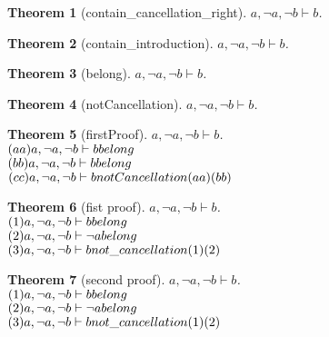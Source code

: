 \documentclass[11pt]{article}
\newtheorem{theorem}{Theorem}
\def\turn{\vdash}
\begin{document}
\begin{theorem}[contain_cancellation_right] $ a, \neg a, \neg b \turn b $.\\
\end{theorem}
\begin{theorem}[contain_introduction] $ a, \neg a, \neg b \turn b $.\\
\end{theorem}
\begin{theorem}[belong] $ a, \neg a, \neg b \turn b $.\\
\end{theorem}
\begin{theorem}[notCancellation] $ a, \neg a, \neg b \turn b $.\\
\end{theorem}
\begin{theorem}[firstProof] $ a, \neg a, \neg b \turn b $.\\
$(aa)a, \neg a, \neg b \turn b \hfill belong  $\\
$(bb)a, \neg a, \neg b \turn b \hfill belong  $\\
$(cc)a, \neg a, \neg b \turn b \hfill notCancellation (aa)(bb) $\\
\end{theorem}
\begin{theorem}[fist proof] $ a, \neg a, \neg b \turn b $.\\
$(1)a, \neg a, \neg b \turn b \hfill belong $\\
$(2)a, \neg a, \neg b \turn \neg a \hfill belong $\\
$(3)a, \neg a, \neg b \turn b \hfill not \_ cancellation (1)(2) $\\
\end{theorem}
\begin{theorem}[second proof] $ a, \neg a, \neg b \turn b $.\\
$(1)a, \neg a, \neg b \turn b \hfill belong $\\
$(2)a, \neg a, \neg b \turn \neg a \hfill belong $\\
$(3)a, \neg a, \neg b \turn b \hfill not \_ cancellation (1)(2) $\\
\end{theorem}
\end{document}
